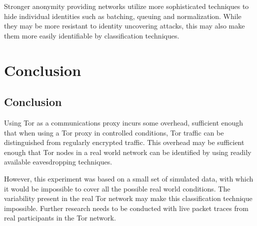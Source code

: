 Stronger anonymity providing networks utilize more sophisticated techniques to
hide individual identities such as batching, queuing and normalization. While
they may be more resistant to identity uncovering attacks, this may also make
them more easily identifiable by classification techniques.


\chapter{Conclusion}

\section{Conclusion}

Using Tor as a communications proxy incurs some overhead, sufficient enough that
when using a Tor proxy in controlled conditions, Tor traffic can be
distinguished from regularly encrypted traffic. This overhead may be sufficient
enough that Tor nodes in a real world network can be identified by using readily
available eavesdropping techniques.

However, this experiment was based on a small set of simulated data, with which
it would be impossible to cover all the possible real world conditions. The
variability present in the real Tor network may make this classification
technique impossible. Further research needs to be conducted with live packet
traces from real participants in the Tor network.

